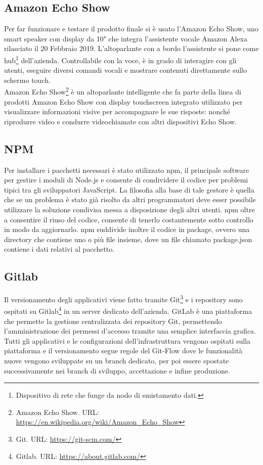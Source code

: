 \subsection{Amazon Echo Show}
Per far funzionare e testare il prodotto finale si è usato l'Amazon Echo Show, uno smart speaker con display da 10" che integra l’assistente vocale Amazon Alexa rilasciato il 20 Febbraio 2019. L'altoparlante con a bordo l'assistente si pone come hub\footnote{Dispositivo di rete che funge da nodo di smistamento dati.} dell'azienda. Controllabile con la voce, è in grado di interagire con gli utenti, eseguire diversi comandi vocali e mostrare contenuti direttamente sullo schermo touch.\\ Amazon Echo Show\footnote{Amazon Echo Show. URL: \href{https://en.wikipedia.org/wiki/Amazon\_Echo\_Show}{https://en.wikipedia.org/wiki/Amazon\_Echo\_Show}} è un altoparlante intelligente che fa parte della linea di prodotti Amazon Echo Show con display touchscreen integrato utilizzato per visualizzare informazioni visive per accompagnare le sue risposte: nonché riprodurre video e condurre videochiamate con altri dispositivi Echo Show.

\subsection{NPM}
\label{npm}
Per installare i pacchetti necessari è stato utilizzato npm, il principale software per gestire i moduli di Node.js e consente di condividere il codice per problemi tipici tra gli sviluppatori JavaScript. La filosofia alla base di tale gestore è quella che se un problema è stato già risolto da altri programmatori deve esser possibile utilizzare la soluzione condivisa messa a disposizione degli altri utenti. npm oltre a consentire il riuso del codice, consente di tenerlo costantemente sotto controllo in modo da aggiornarlo. npm suddivide inoltre il codice in package, ovvero una directory che contiene uno o più file insieme, dove un file chiamato package.json contiene i dati relativi al pacchetto.

\subsection{Gitlab}
Il versionamento degli applicativi viene fatto tramite Git\footnote{Git. URL: \href{https://git-scm.com/}{https://git-scm.com/}} e i repository sono ospitati su Gitlab\footnote{Gitlab. URL: \href{https://about.gitlab.com/}{https://about.gitlab.com/}} in un server dedicato dell'azienda. GitLab è una piattaforma che permette la gestione centralizzata dei repository Git, permettendo l'amministrazione dei permessi d'accesso tramite una semplice interfaccia grafica. Tutti gli applicativi e le configurazioni dell'infrastruttura vengono ospitati sulla piattaforma e il versionamento segue regole del Git-Flow dove le funzionalità nuove vengono sviluppate su un branch dedicato, per poi essere spostate successivamente nei branch di sviluppo, accettazione e infine produzione.

